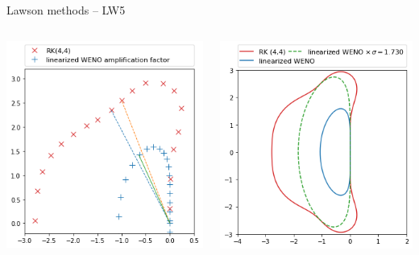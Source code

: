 \documentclass{beamer}
\begin{document}
\begin{frame}{Lawson methods -- LW5}
  \begin{columns}
    \begin{column}{0.5\textwidth}
      \includegraphics[width=\textwidth]{img/cfl_scheme}
    \end{column}
    \begin{column}{0.5\textwidth}
      \includegraphics[width=\textwidth]{img/cfl_rk44_weno.png}
    \end{column}
  \end{columns}
\end{frame}
\end{document}
